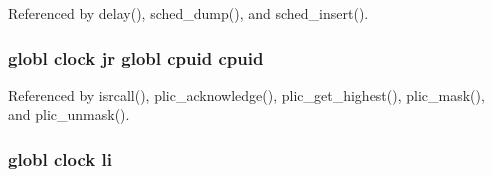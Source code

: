 Referenced by delay(), sched\-\_\-dump(), and sched\-\_\-insert().

\hypertarget{mips_2cpuregs_8S_a78a056c2e0d1097b3c4d7e569b8cdc0a}{
\subsubsection[{cpuid}]{\setlength{\rightskip}{0pt plus 5cm}globl {\bf clock} jr globl cpuid cpuid}}\label{mips_2cpuregs_8S_a78a056c2e0d1097b3c4d7e569b8cdc0a}


Referenced by isrcall(), plic\-\_\-acknowledge(), plic\-\_\-get\-\_\-highest(), plic\-\_\-mask(), and plic\-\_\-unmask().

\hypertarget{mips_2cpuregs_8S_ace4a8178e9cd55f1d8c8184a3945ef71}{
\subsubsection[{li}]{\setlength{\rightskip}{0pt plus 5cm}globl {\bf clock} li}}\label{mips_2cpuregs_8S_ace4a8178e9cd55f1d8c8184a3945ef71}
